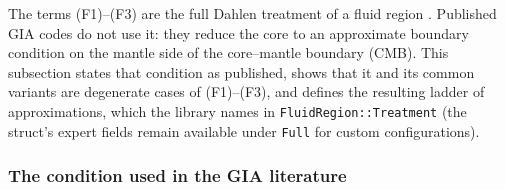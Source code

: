 \documentclass[11pt]{article}
\numberwithin{equation}{section}
\theoremstyle{remark}
\newcommand{\code}[1]{\texttt{#1}}
\begin{document}
The terms (F1)--(F3) are the full Dahlen treatment of a fluid region
\cite{Dahlen1974,DahlenTromp1998,AW10}. Published GIA codes do not use it:
they reduce the core to an approximate boundary condition on the mantle
side of the core--mantle boundary (CMB). This subsection states that
condition as published, shows that it and its common variants are
degenerate cases of (F1)--(F3), and defines the resulting ladder of
approximations, which the library names in
\code{FluidRegion::Treatment} (the struct's expert fields remain
available under \code{Full} for custom configurations).

\subsubsection{The condition used in the GIA literature}
\end{document}

